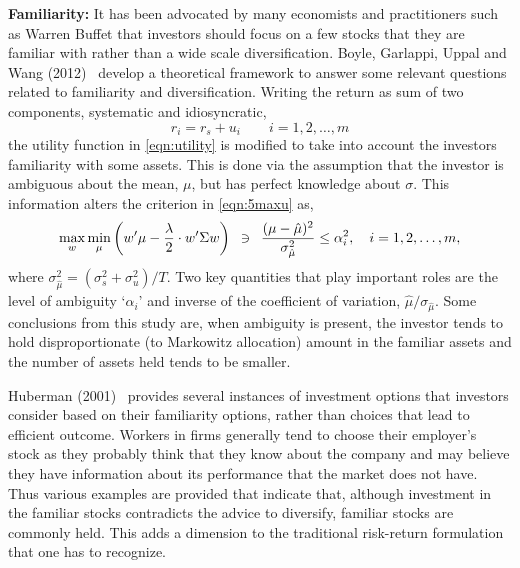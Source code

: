 \noindent \textbf{Familiarity:} It has been advocated by many economists and practitioners such as Warren Buffet that investors should focus on a few stocks that they are familiar with rather than a wide scale diversification. Boyle, Garlappi, Uppal and Wang (2012)~\cite{bguwang} develop a theoretical framework to answer some relevant questions related to familiarity and diversification. Writing the return as sum of two components, systematic and idiosyncratic,
	\begin{equation} \label{eqn:rirsui}
	r_i = r_s + u_i \quad\quad i= 1, 2, \ldots, m
	\end{equation}
the utility function in \eqref{eqn:utility} is modified to take into account the investors familiarity with some assets. This is done via the assumption that the investor is ambiguous about the mean, $\mu$, but has perfect knowledge about $\sigma$. This information alters the criterion in \eqref{eqn:5maxu} as,
	\begin{equation}\label{eqn:maxminwmu}
	\max_w \min_\mu \left( w'\mu - \frac{\lambda}{2} \cdot w' \Sigma w \right) \enskip \ni \enskip \dfrac{(\mu-\hat{\mu})^2}{\sigma_{\hat{\mu}}^2} \leq \alpha_i^2, \quad i= 1, 2, \ldots, m,
	\end{equation}
where $\sigma_{\hat{\mu}}^2= (\sigma_s^2+\sigma_u^2)/T$. Two key quantities that play important roles are the level of ambiguity `$\alpha_i$' and inverse of the coefficient of variation, $\hat{\mu}/\sigma_{\hat{\mu}}$. Some conclusions from this study are, when ambiguity is present, the investor tends to hold disproportionate (to Markowitz allocation) amount in the familiar assets and the number of assets held tends to be smaller.


Huberman (2001)~\cite{Hub} provides several instances of investment options that investors consider based on their familiarity options, rather than choices that lead to efficient outcome. Workers in firms generally tend to choose their employer's stock as they probably think that they know about the company and may believe they have information about its performance that the market does not have. Thus various examples are provided that indicate that, although investment in the familiar stocks contradicts the advice to diversify, familiar stocks are commonly held. This adds a dimension to the traditional risk-return formulation that one has to recognize. \twomedskip


